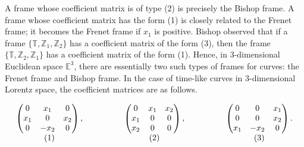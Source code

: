 \documentclass[a4paper]{amsart}
\theoremstyle{definition}
\theoremstyle{remark}
\newcommand{\TT}{\mathbb{T}}
\newcommand{\ZZ}{\mathbb{Z}}
\newcommand{\EE}{\mathbb{E}}
\numberwithin{equation}{section}
\begin{document}
A frame whose coefficient matrix is of type (2) is precisely the Bishop frame. A frame whose coefficient matrix has the form (1) is closely related to the Frenet frame; it becomes the Frenet frame if $x_1$ is positive.
Bishop observed that if a frame $\{\TT, \ZZ_1, \ZZ_2\}$ has a coefficient matrix of the form (3), then the frame $\{\TT, \ZZ_{2}, \ZZ_{1}\}$ has a coefficient matrix of the form (1). Hence, in 3-dimensional Euclidean space $\EE^{3}$, there are essentially two such types of frames for curves: the Frenet frame and Bishop frame. In the case of time-like curves in 3-dimensional Lorentz space, the coefficient matrices are as follows.

\[
\begin{array}{c c c}
\left(\begin{matrix}
0 & x_{1} & 0 \\
x_{1} & 0 & x_{2} \\
0 & -x_{2} & 0
\end{matrix}\right), 
& \hspace{40pt} 
\left(\begin{matrix}
0 & x_{1} & x_{2} \\
x_{1} & 0 & 0 \\
x_{2} & 0 & 0
\end{matrix}\right),
& \hspace{40pt} 
\left(\begin{matrix}
0 & 0 & x_{1} \\
0 & 0 & x_{2} \\
x_{1} & -x_{2} & 0
\end{matrix}\right). \\
(1) & \hspace{40pt} (2) & \hspace{40pt} (3)
\end{array}
\]
\end{document}
